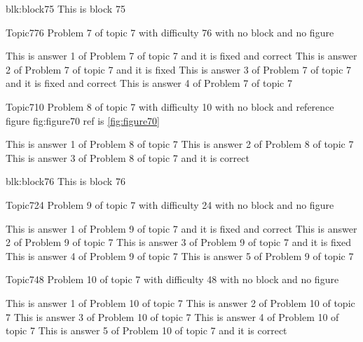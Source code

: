 \documentclass[master]{exam}
\begin{document}
\begin{block}{blk:block75}
This is block 75
\end{block}


\begin{problem}{Topic7}{76}
	Problem 7 of topic 7 with difficulty 76 with no block and no figure
	\begin{answers}
		 This is answer 1 of Problem 7 of topic 7 and it is fixed and correct
		\answer[fixed] This is answer 2 of Problem 7 of topic 7 and it is fixed
		 This is answer 3 of Problem 7 of topic 7 and it is fixed and correct
		\answer This is answer 4 of Problem 7 of topic 7 
	\end{answers}
\end{problem}

\begin{problem}{Topic7}{10}
	Problem 8 of topic 7 with difficulty 10 with no block and reference figure fig:figure70 ref is \ref{fig:figure70}
	\begin{answers}
		\answer This is answer 1 of Problem 8 of topic 7 
		\answer This is answer 2 of Problem 8 of topic 7 
		\answer[correct] This is answer 3 of Problem 8 of topic 7 and it is correct
	\end{answers}
\end{problem}



\begin{block}{blk:block76}
This is block 76
\end{block}


\begin{problem}{Topic7}{24}
	Problem 9 of topic 7 with difficulty 24 with no block and no figure
	\begin{answers}
		 This is answer 1 of Problem 9 of topic 7 and it is fixed and correct
		\answer This is answer 2 of Problem 9 of topic 7 
		\answer[fixed] This is answer 3 of Problem 9 of topic 7 and it is fixed
		\answer This is answer 4 of Problem 9 of topic 7 
		\answer This is answer 5 of Problem 9 of topic 7 
	\end{answers}
\end{problem}

\begin{problem}{Topic7}{48}
	Problem 10 of topic 7 with difficulty 48 with no block and no figure
	\begin{answers}
		\answer This is answer 1 of Problem 10 of topic 7 
		\answer This is answer 2 of Problem 10 of topic 7 
		\answer This is answer 3 of Problem 10 of topic 7 
		\answer This is answer 4 of Problem 10 of topic 7 
		\answer[correct] This is answer 5 of Problem 10 of topic 7 and it is correct
	\end{answers}
\end{problem}
\end{document}
